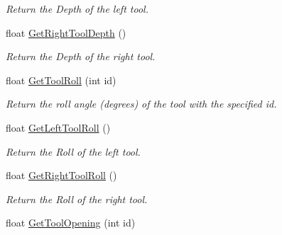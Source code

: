 \begin{DoxyCompactItemize}
\begin{DoxyCompactList}\small\item\em Return the Depth of the left tool. \item\end{DoxyCompactList}\item 
\hypertarget{classvtkIHP_a0d3f18bd000b9e1f76714fa12e195bcb}{
float \hyperlink{classvtkIHP_a0d3f18bd000b9e1f76714fa12e195bcb}{GetRightToolDepth} ()}
\label{classvtkIHP_a0d3f18bd000b9e1f76714fa12e195bcb}

\begin{DoxyCompactList}\small\item\em Return the Depth of the right tool. \item\end{DoxyCompactList}\item 
\hypertarget{classvtkIHP_a7e669f18fb17a52359ce3968925af610}{
float \hyperlink{classvtkIHP_a7e669f18fb17a52359ce3968925af610}{GetToolRoll} (int id)}
\label{classvtkIHP_a7e669f18fb17a52359ce3968925af610}

\begin{DoxyCompactList}\small\item\em Return the roll angle (degrees) of the tool with the specified id. \item\end{DoxyCompactList}\item 
\hypertarget{classvtkIHP_aba1bd3e7898f4b119225cd6fb6782bf4}{
float \hyperlink{classvtkIHP_aba1bd3e7898f4b119225cd6fb6782bf4}{GetLeftToolRoll} ()}
\label{classvtkIHP_aba1bd3e7898f4b119225cd6fb6782bf4}

\begin{DoxyCompactList}\small\item\em Return the Roll of the left tool. \item\end{DoxyCompactList}\item 
\hypertarget{classvtkIHP_aaf3c5d7a07e13ad75e3d575b45df6a98}{
float \hyperlink{classvtkIHP_aaf3c5d7a07e13ad75e3d575b45df6a98}{GetRightToolRoll} ()}
\label{classvtkIHP_aaf3c5d7a07e13ad75e3d575b45df6a98}

\begin{DoxyCompactList}\small\item\em Return the Roll of the right tool. \item\end{DoxyCompactList}\item 
\hypertarget{classvtkIHP_a8f60174d2f0b00d8ee7141e694b1c026}{
float \hyperlink{classvtkIHP_a8f60174d2f0b00d8ee7141e694b1c026}{GetToolOpening} (int id)}
\label{classvtkIHP_a8f60174d2f0b00d8ee7141e694b1c026}


\end{DoxyCompactItemize}
